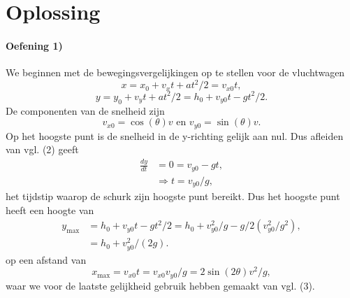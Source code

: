\documentclass[11pt]{article}
\begin{document}
\section{Oplossing}

\paragraph{Oefening 1)} 

We beginnen met de bewegingsvergelijkingen op te stellen voor de vluchtwagen
\begin{equation}
    x = x_0 + v_x t + a t^2 /2 = v_{x0} t,
\end{equation}
\begin{equation}
    y = y_0 + v_y t + a t^2 /2 = h_0 + v_{y0} t - gt^2/2.
\end{equation}
De componenten van de snelheid zijn
\begin{equation}
    v_{x0} = \cos(\theta) v \text{ en } v_{y0} = \sin(\theta) v.
\end{equation}
Op het hoogste punt is de snelheid in de y-richting gelijk aan nul. Dus afleiden van vgl. (2) geeft
\begin{equation}
    \begin{split}
        \frac{dy}{dt} &= 0 = v_{y0} - gt,\\
        &\Rightarrow t = v_{y0} / g,
    \end{split}
\end{equation}
het tijdstip waarop de schurk zijn hoogste punt bereikt. Dus het hoogste punt heeft een hoogte van 
\begin{equation}
    \begin{split}
        y_{\text{max}} &= h_0 + v_{y0} t - gt^2/2 = h_0 + v_{y0}^2 / g - g/2 (v_{y0}^2 / g^2),\\
        & = h_0 + v_{y0}^2 / (2g).
    \end{split}
\end{equation}
op een afstand van 
\begin{equation}
    x_{\text{max}} = v_{x0} t = v_{x0} v_{y0}/g = 2 \sin(2\theta)v^2/g,
\end{equation}
waar we voor de laatste gelijkheid gebruik hebben gemaakt van vgl. (3).
\end{document}
